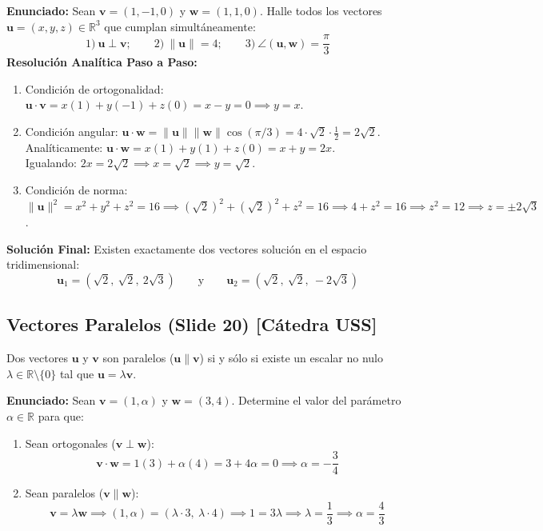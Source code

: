 \documentclass[10pt,letterpaper]{article}
\newcommand{\vu}{\mathbf{u}}
\newcommand{\vv}{\mathbf{v}}
\newcommand{\vw}{\mathbf{w}}
\begin{document}
\begin{cajaEjemplo}
\textbf{Enunciado:} Sean $\vv = (1, -1, 0)$ y $\vw = (1, 1, 0)$. Halle todos los vectores $\vu = (x, y, z) \in \mathbb{R}^3$ que cumplan simultáneamente:
\[
1)\ \vu \perp \vv; \qquad 2)\ \|\vu\| = 4; \qquad 3)\ \angle(\vu, \vw) = \frac{\pi}{3}
\]
\textbf{Resolución Analítica Paso a Paso:}
\begin{enumerate}
    \item Condición de ortogonalidad: $\vu \cdot \vv = x(1) + y(-1) + z(0) = x - y = 0 \implies y = x$.
    \item Condición angular: $\vu \cdot \vw = \|\vu\|\|\vw\|\cos(\pi/3) = 4 \cdot \sqrt{2} \cdot \frac{1}{2} = 2\sqrt{2}$.\\
    Analíticamente: $\vu \cdot \vw = x(1) + y(1) + z(0) = x + y = 2x$.\\
    Igualando: $2x = 2\sqrt{2} \implies x = \sqrt{2} \implies y = \sqrt{2}$.
    \item Condición de norma: $\|\vu\|^2 = x^2 + y^2 + z^2 = 16 \implies (\sqrt{2})^2 + (\sqrt{2})^2 + z^2 = 16 \implies 4 + z^2 = 16 \implies z^2 = 12 \implies z = \pm 2\sqrt{3}$.
\end{enumerate}
\textbf{Solución Final:} Existen exactamente dos vectores solución en el espacio tridimensional:
\[
\vu_1 = (\sqrt{2},\ \sqrt{2},\ 2\sqrt{3}) \qquad \text{y} \qquad \vu_2 = (\sqrt{2},\ \sqrt{2},\ -2\sqrt{3})
\]
\end{cajaEjemplo}

\subsection{Vectores Paralelos (Slide 20) [Cátedra USS]}
Dos vectores $\vu$ y $\vv$ son paralelos ($\vu \parallel \vv$) si y sólo si existe un escalar no nulo $\lambda \in \mathbb{R} \setminus \{0\}$ tal que $\vu = \lambda\vv$.

\begin{cajaEjemplo}
\textbf{Enunciado:} Sean $\vv = (1, \alpha)$ y $\vw = (3, 4)$. Determine el valor del parámetro $\alpha \in \mathbb{R}$ para que:
\begin{enumerate}
    \item Sean ortogonales ($\vv \perp \vw$):
    \[
    \vv \cdot \vw = 1(3) + \alpha(4) = 3 + 4\alpha = 0 \implies \alpha = -\frac{3}{4}
    \]
    \item Sean paralelos ($\vv \parallel \vw$):
    \[
    \vv = \lambda\vw \implies (1, \alpha) = (\lambda \cdot 3,\ \lambda \cdot 4) \implies 1 = 3\lambda \implies \lambda = \frac{1}{3} \implies \alpha = \frac{4}{3}
    \]
\end{enumerate}
\end{cajaEjemplo}
\end{document}
